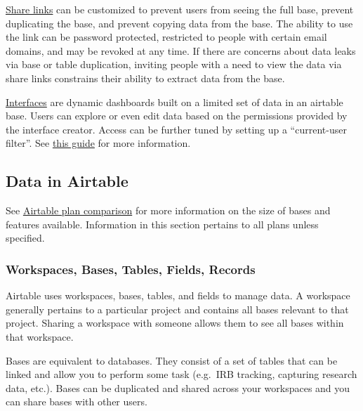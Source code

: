 \documentclass[
]{book}
\begin{document}
\href{https://support.airtable.com/docs/creating-a-base-share-link-or-a-view-share-link}{Share links} can be customized to prevent users from seeing the full base, prevent duplicating the base, and prevent copying data from the base. The ability to use the link can be password protected, restricted to people with certain email domains, and may be revoked at any time. If there are concerns about data leaks via base or table duplication, inviting people with a need to view the data via share links constrains their ability to extract data from the base.

\href{https://support.airtable.com/docs/interface-designer-overview}{Interfaces} are dynamic dashboards built on a limited set of data in an airtable base. Users can explore or even edit data based on the permissions provided by the interface creator. Access can be further tuned by setting up a ``current-user filter''. See \href{https://support.airtable.com/docs/interface-designer-permissions}{this guide} for more information.

\hypertarget{data-in-airtable}{%
\subsection{Data in Airtable}\label{data-in-airtable}}

See \href{https://support.airtable.com/hc/en-us/articles/115010928147-Airtable-plans}{Airtable plan comparison} for more information on the size of bases and features available. Information in this section pertains to all plans unless specified.

\hypertarget{workspaces-bases-tables-fields-records}{%
\subsubsection{Workspaces, Bases, Tables, Fields, Records}\label{workspaces-bases-tables-fields-records}}

Airtable uses workspaces, bases, tables, and fields to manage data. A workspace generally pertains to a particular project and contains all bases relevant to that project. Sharing a workspace with someone allows them to see all bases within that workspace.

Bases are equivalent to databases. They consist of a set of tables that can be linked and allow you to perform some task (e.g.~IRB tracking, capturing research data, etc.). Bases can be duplicated and shared across your workspaces and you can share bases with other users.
\end{document}
